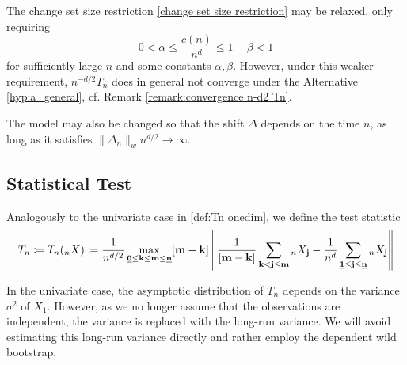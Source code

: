 \begin{remark}
    \begin{aufzi}
        \item The change set size restriction \eqref{change set size restriction} may be relaxed, only requiring \[ 0 < \alpha \leq \frac{c(n)}{n^d} \leq 1-\beta < 1 \] for sufficiently large $n$ and some constants $\alpha, \beta$. However, under this weaker requirement, $n^{-d/2} T_n$ does in general not converge under the Alternative \ref{hyp:a_general}, cf. Remark \ref{remark:convergence n-d2 Tn}.
        \item The model may also be changed so that the shift $\Delta$ depends on the time $n$, as long as it satisfies $ \| \Delta_n \|_w n^{d/2} \to \infty$.
    \end{aufzi}
\end{remark}

\subsection{Statistical Test} \label{section:statistical test}

Analogously to the univariate case in \eqref{def:Tn onedim}, we define the test statistic
\begin{equation} \label{definition:test statistic}
        T_n \coloneqq T_n({}_{n}X) \coloneqq \frac{1}{n^{d/2}} \max\limits_{\usbf[0] \leq \mathbf{k} \leq \mathbf{m} \leq \usbf[n]} [\mathbf{m} - \mathbf{k}] \left\| \frac{1}{[\mathbf{m} - \mathbf{k}]} \sum\limits_{\mathbf{k} < \mathbf{j} \leq \mathbf{m}} {}_{n}X_\mathbf{j} - \frac{1}{n^d} \sum\limits_{\usbf[1] \leq \mathbf{j} \leq \usbf[n]} {}_{n}X_\mathbf{j} \right\| 
\end{equation}

In the univariate case, the asymptotic distribution of $T_n$ depends on the variance $\sigma^2$ of $X_1$. However, as we no longer assume that the observations are independent, the variance is replaced with the long-run variance. We will avoid estimating this long-run variance directly and rather employ the dependent wild bootstrap. 

